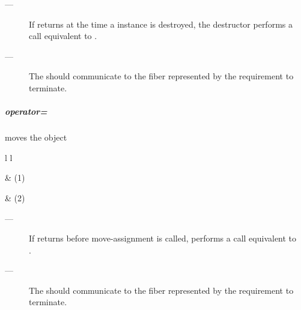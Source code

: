 \remarks
\begin{description}
    \item[---] If  returns  at the time a \fiber
               instance is destroyed, the destructor performs a call
               equivalent to .
    \item[---] The \cancelfn should communicate to the fiber represented by 
               the requirement to terminate. 
\end{description}

\subparagraph*{operator=}
moves the \fiber object

\begin{tabular}{ l l }
    \midrule

     & (1)\\

    \midrule

     & (2)\\

    \midrule
\end{tabular}

\remarks
\begin{description}
    \item[---] If  returns  before move-assignment is
               called,  performs a call
               equivalent to\\ .
    \item[---] The \cancelfn should communicate to the fiber represented by 
               the requirement to terminate. 
\end{description}

